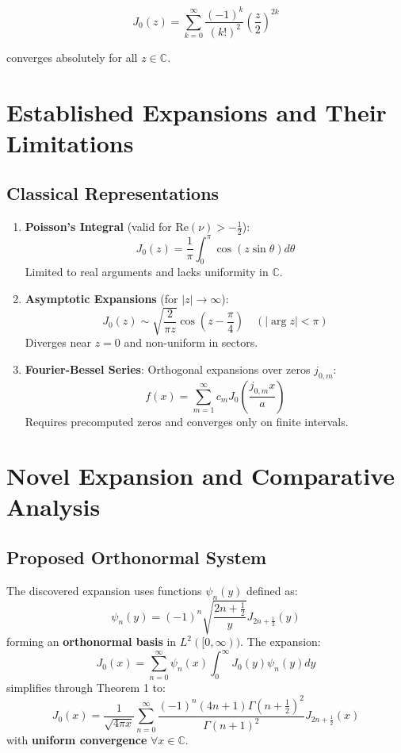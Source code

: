 \documentclass{article}
\begin{document}
$$J_0(z) = \sum_{k=0}^\infty \frac{(-1)^k}{(k!)^2} \left(\frac{z}{2}\right)^{2k}$$

converges absolutely for all $z \in \mathbb{C}$.

\section*{Established Expansions and Their Limitations}

\subsection*{Classical Representations}

\begin{enumerate}
    \item \textbf{Poisson's Integral} (valid for $\text{Re}(\nu) > -\frac{1}{2}$):
    $$J_0(z) = \frac{1}{\pi} \int_0^\pi \cos(z \sin\theta) d\theta$$
    Limited to real arguments and lacks uniformity in $\mathbb{C}$.
    
    \item \textbf{Asymptotic Expansions} (for $|z| \to \infty$):
    $$J_0(z) \sim \sqrt{\frac{2}{\pi z}} \cos\left(z - \frac{\pi}{4}\right) \quad (|\arg z| < \pi)$$
    Diverges near $z = 0$ and non-uniform in sectors.
    
    \item \textbf{Fourier-Bessel Series}:
    Orthogonal expansions over zeros $j_{0,m}$:
    $$f(x) = \sum_{m=1}^\infty c_m J_0\left(\frac{j_{0,m}x}{a}\right)$$
    Requires precomputed zeros and converges only on finite intervals.
\end{enumerate}

\section*{Novel Expansion and Comparative Analysis}

\subsection*{Proposed Orthonormal System}

The discovered expansion uses functions $\psi_n(y)$ defined as:
$$\psi_n(y) = (-1)^n \sqrt{\frac{2n + \frac{1}{2}}{y}} J_{2n + \frac{1}{2}}(y)$$
forming an \textbf{orthonormal basis} in $L^2([0, \infty))$. The expansion:
$$J_0(x) = \sum_{n=0}^\infty \psi_n(x) \int_0^\infty J_0(y) \psi_n(y) dy$$
simplifies through Theorem 1 to:
$$J_0(x) = \frac{1}{\sqrt{4\pi x}} \sum_{n=0}^\infty \frac{(-1)^n (4n + 1) \Gamma(n + \frac{1}{2})^2}{\Gamma(n + 1)^2} J_{2n + \frac{1}{2}}(x)$$
with \textbf{uniform convergence} $\forall x \in \mathbb{C}$.
\end{document}
